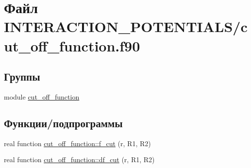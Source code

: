 \hypertarget{cut__off__function_8f90}{}\section{Файл I\+N\+T\+E\+R\+A\+C\+T\+I\+O\+N\+\_\+\+P\+O\+T\+E\+N\+T\+I\+A\+L\+S/cut\+\_\+off\+\_\+function.f90}
\label{cut__off__function_8f90}
\subsection*{Группы}
\begin{DoxyCompactItemize}
\item 
module \mbox{\hyperlink{namespacecut__off__function}{cut\+\_\+off\+\_\+function}}
\end{DoxyCompactItemize}
\subsection*{Функции/подпрограммы}
\begin{DoxyCompactItemize}
\item 
real function \mbox{\hyperlink{namespacecut__off__function_acbf245e7d7bceb779e0510765042488b}{cut\+\_\+off\+\_\+function\+::f\+\_\+cut}} (r, R1, R2)
\item 
real function \mbox{\hyperlink{namespacecut__off__function_af45796458c2774f2b3b30c3592efcae5}{cut\+\_\+off\+\_\+function\+::df\+\_\+cut}} (r, R1, R2)
\end{DoxyCompactItemize}
